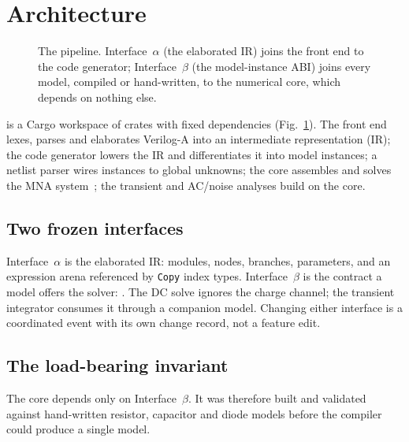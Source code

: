 \section{Architecture}
\label{sec:arch}

\begin{figure}[t]
  \centering
  
  \caption{The pipeline. Interface~$\alpha$ (the elaborated IR) joins the front end to the code
  generator; Interface~$\beta$ (the model-instance ABI) joins every model, compiled or
  hand-written, to the numerical core, which depends on nothing else.}
  \label{fig:pipeline}
\end{figure}

\vas{} is a Cargo workspace of crates with fixed dependencies (Fig.~\ref{fig:pipeline}). The
front end lexes, parses and elaborates Verilog-A into an intermediate representation (IR); the
code generator lowers the IR and differentiates it into model instances; a netlist parser wires
instances to global unknowns; the core assembles and solves the MNA system~\cite{ho1975mna}; the
transient and AC/noise analyses build on the core.

\subsection{Two frozen interfaces}
Interface~$\alpha$ is the elaborated IR: modules, nodes, branches, parameters, and an expression
arena referenced by \texttt{Copy} index types. Interface~$\beta$ is the contract a model offers
the solver:
.
The DC solve ignores the charge channel; the transient integrator consumes it through a companion
model. Changing either interface is a coordinated event with its own change record, not a
feature edit.

\subsection{The load-bearing invariant}
The core depends only on Interface~$\beta$. It was therefore built and validated against
hand-written resistor, capacitor and diode models before the compiler could produce a single
model. 

